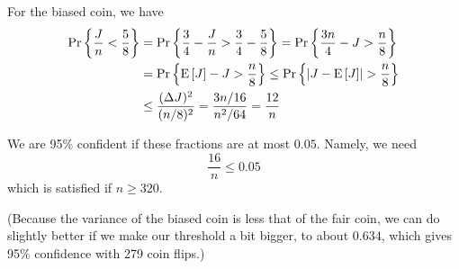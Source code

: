 \documentclass[twoside,12pt]{article}
\providecommand{\abs}[1]{\lvert#1\rvert}
\newcommand{\variance}[1]{(\Delta{#1})^2}
\begin{document}
\begin{problem}{7}
{For the biased coin, we have
\begin{align*}
\pr{\frac{J}{n} < \frac{5}{8} } & =
  \pr{\frac{3}{4} - \frac{J}{n} > \frac{3}{4} - \frac{5}{8}}
  = \pr{\frac{3n}{4} - J > \frac{n}{8} } \\ 
  & = \pr{\expect{J} - J > \frac{n}{8} } \leq
                   \pr{\abs{J - \expect{J}} > \frac{n}{8}} \\
& \leq \frac{\variance{J}}{(n/8)^2} = \frac{3n/16}{n^2/64}
  = \frac{12}{n}
\end{align*}

We are 95\% confident if these fractions are at most $0.05$.  Namely, we
need
\[
\frac{16}{n} \leq 0.05
\]
which is satisfied if $n \geq 320$.

(Because the variance of the biased coin is less that of the fair coin, we
can do slightly better if we make our threshold a bit bigger, to about
$0.634$, which gives 95\% confidence with 279 coin flips.)
\fi
}
\end{problem}
\end{document}
